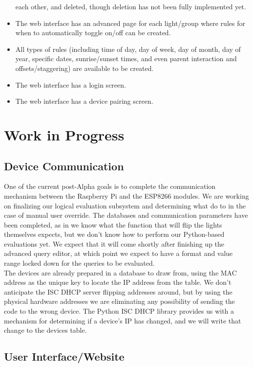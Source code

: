 \documentclass[oneside,openright]{book}
\begin{document}
\begin{itemize}
        each other, and deleted, though deletion has not been fully implemented
        yet.
    \item The web interface has an advanced page for each light/group where
        rules for when to automatically toggle on/off can be created.
    \item All types of rules (including time of day, day of week, day of month,
        day of year, specific dates, sunrise/sunset times, and even parent
        interaction and offsets/staggering) are available to be created.
    \item The web interface has a login screen.
    \item The web interface has a device pairing screen.
\end{itemize}

\section{Work in Progress}

\subsection{Device Communication}

One of the current post-Alpha goals is to complete the communication mechanism
between the Raspberry Pi and the ESP8266 modules. We are working on finalizing
our logical evaluation subsystem and determining what do to in the case of
manual user override. The databases and communication parameters have been
completed, as in we know what the function that will flip the lights themselves
expects, but we don't know how to perform our Python-based evaluations yet. We
expect that it will come shortly after finishing up the advanced query editor,
at which point we expect to have a format and value range locked down for the
queries to be evaluated.\\

The devices are already prepared in a database to draw from, using the MAC
address as the unique key to locate the IP address from the table. We don't
anticipate the ISC DHCP server flipping addresses around, but by using the
physical hardware addresses we are eliminating any possibility of sending the
code to the wrong device. The Python ISC DHCP library provides us with a
mechanism for determining if a device's IP has changed, and we will write that
change to the devices table.

\subsection{User Interface/Website}
\end{document}
